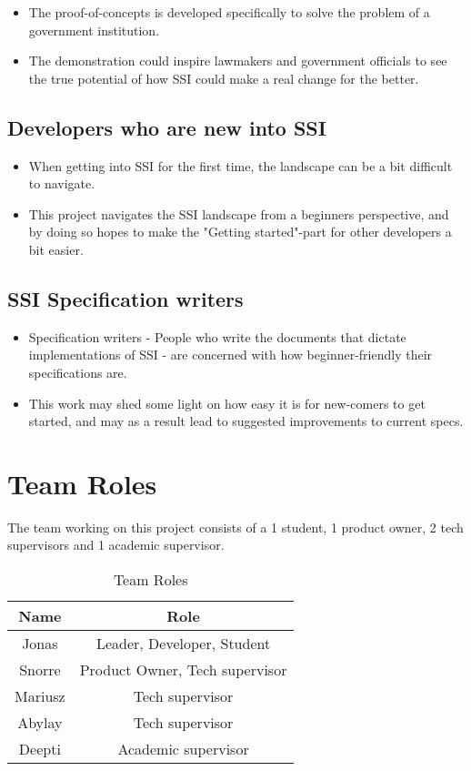 \begin{itemize}
\item The proof-of-concepts is developed specifically to solve the problem of a government institution.
\item The demonstration could inspire lawmakers and government officials to see the true potential of how SSI could make a real change for the better.
\end{itemize}

\subsection{Developers who are new into SSI}
\begin{itemize}
\item When getting into SSI for the first time, the landscape can be a bit difficult to navigate.
\item This project navigates the SSI landscape from a beginners perspective, and by doing so hopes to make the "Getting started"-part for other developers a bit easier.
\end{itemize}

\subsection{SSI Specification writers}
\begin{itemize}
\item Specification writers - People who write the documents that dictate implementations of SSI - are concerned with how beginner-friendly their specifications are.
\item This work may shed some light on how easy it is for new-comers to get started, and may as a result lead to suggested improvements to current specs.
\end{itemize}





\section{Team Roles}

The team working on this project consists of a 1 student, 1 product owner, 2 tech supervisors and 1 academic supervisor.

\begin{table}
  \centering
  \caption{Team Roles}
  \label{tab:example1}
  \begin{tabular}{cc}
    \hline
    Name  & Role \\
    \hline
    Jonas       & Leader, Developer, Student         \\
    Snorre      & Product Owner, Tech supervisor \\
    Mariusz     & Tech supervisor \\
    Abylay      & Tech supervisor \\
    Deepti      & Academic supervisor \\
    \hline
  \end{tabular}
\end{table}



